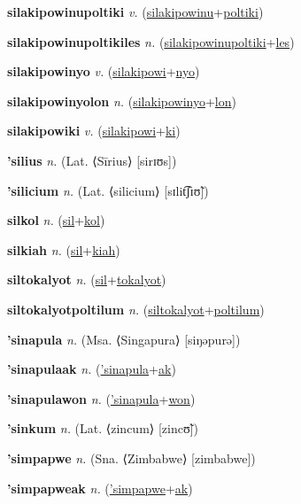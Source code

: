 \textbf{\hypertarget{silakipowinupoltiki}{silakipowinupoltiki}} \textit{v.} (\hyperlink{silakipowinu}{silakipowinu}+\allowbreak \hyperlink{poltiki}{poltiki})


\textbf{\hypertarget{silakipowinupoltikiles}{silakipowinupoltikiles}} \textit{n.} (\hyperlink{silakipowinupoltiki}{silakipowinupoltiki}+\allowbreak \hyperlink{les}{les})


\textbf{\hypertarget{silakipowinyo}{silakipowinyo}} \textit{v.} (\hyperlink{silakipowi}{silakipowi}+\allowbreak \hyperlink{nyo}{nyo})


\textbf{\hypertarget{silakipowinyolon}{silakipowinyolon}} \textit{n.} (\hyperlink{silakipowinyo}{silakipowinyo}+\allowbreak \hyperlink{lon}{lon})


\textbf{\hypertarget{silakipowiki}{silakipowiki}} \textit{v.} (\hyperlink{silakipowi}{silakipowi}+\allowbreak \hyperlink{ki}{ki})


\textbf{\hypertarget{'silius}{'silius}} \textit{n.} (Lat. ⟨Sīrius⟩ [sirɪʊs])


\textbf{\hypertarget{'silicium}{'silicium}} \textit{n.} (Lat. ⟨silicium⟩ [sɪlit͡ʃɪʊ̃])


\textbf{\hypertarget{silkol}{silkol}} \textit{n.} (\hyperlink{sil}{sil}+\allowbreak \hyperlink{kol}{kol})


\textbf{\hypertarget{silkiah}{silkiah}} \textit{n.} (\hyperlink{sil}{sil}+\allowbreak \hyperlink{kiah}{kiah})


\textbf{\hypertarget{siltokalyot}{siltokalyot}} \textit{n.} (\hyperlink{sil}{sil}+\allowbreak \hyperlink{tokalyot}{tokalyot})


\textbf{\hypertarget{siltokalyotpoltilum}{siltokalyotpoltilum}} \textit{n.} (\hyperlink{siltokalyot}{siltokalyot}+\allowbreak \hyperlink{poltilum}{poltilum})


\textbf{\hypertarget{'sinapula}{'sinapula}} \textit{n.} (Msa. ⟨Singapura⟩ [siŋəpurə])


\textbf{\hypertarget{'sinapulaak}{'sinapulaak}} \textit{n.} (\hyperlink{'sinapula}{'sinapula}+\allowbreak \hyperlink{ak}{ak})


\textbf{\hypertarget{'sinapulawon}{'sinapulawon}} \textit{n.} (\hyperlink{'sinapula}{'sinapula}+\allowbreak \hyperlink{won}{won})


\textbf{\hypertarget{'sinkum}{'sinkum}} \textit{n.} (Lat. ⟨zincum⟩ [zincʊ̃])


\textbf{\hypertarget{'simpapwe}{'simpapwe}} \textit{n.} (Sna. ⟨Zimbabwe⟩ [zimbabwe])


\textbf{\hypertarget{'simpapweak}{'simpapweak}} \textit{n.} (\hyperlink{'simpapwe}{'simpapwe}+\allowbreak \hyperlink{ak}{ak})



